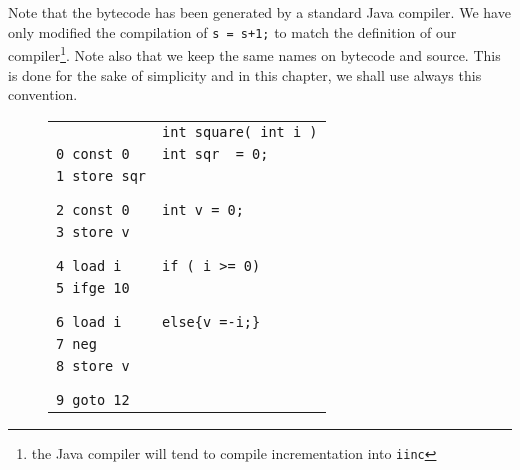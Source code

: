 Note that the bytecode has been generated by a standard Java compiler. We have only modified the compilation of  \lstinline!s = s+1;! to match the definition 
of our compiler\footnote{the Java compiler will tend to compile incrementation into \lstinline!iinc!}. Note also that we keep the same names on bytecode and source.
This is done for the sake of simplicity and in this chapter, we shall use always this convention.

 \begin{figure}[ht!]
\begin{frameit}
  \scriptsize{
  \begin{tabular}{ll}
& \lstinline!int square( int i )!\\
\lstinline!0 const 0!      & \lstinline!int sqr  = 0;! \\
\lstinline!1 store sqr!	   & \\
                           & \\ & \\

\lstinline!2 const 0!      & \lstinline!int v = 0;! \\
\lstinline!3 store v!	   & \\
                           & \\ & \\

\lstinline!4 load i!       & \lstinline!if ( i >= 0)! \\ 
\lstinline!5 ifge 10!	   & \\
 & \\ & \\
\lstinline!6 load i!       & \Myspace \lstinline!else{v =-i;}! \\ 
\lstinline!7 neg!	   & \\
\lstinline!8 store v!	   & \\
                           & \\ & \\
\lstinline!9 goto 12!	   & \\ 


\end{tabular}}
\end{frameit}
\end{figure}
